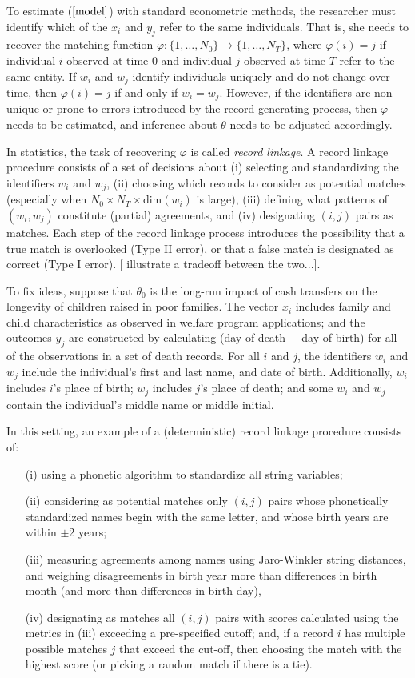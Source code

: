 \documentclass[12pt]{article}
\begin{document}
To estimate ($\ref{model}$) with standard econometric methods, the researcher must identify which of the $x_i$ and $y_j$ refer to the same individuals.   That is, she needs to recover the matching function $\varphi: \{1,\dots, N_0\} \to \{1,\dots, N_T\}$, where $\varphi(i) = j$ if individual $i$ observed at time 0 and individual $j$ observed at time $T$ refer to the same entity.  If $w_i$ and $w_j$ identify individuals uniquely and do not change over time, then $\varphi(i) = j$ if and only if $w_i = w_j$.  However, if the identifiers are non-unique or prone to errors introduced by the record-generating process, then $\varphi$ needs to be estimated, and inference about $\theta$ needs to be adjusted accordingly.   

In statistics, the task of recovering $\varphi$ is called \textit{record linkage}.  A record linkage procedure consists of a set of decisions about (i) selecting and standardizing the identifiers $w_i$ and $w_j$, (ii) choosing which records to consider as potential matches (especially when $N_0 \times N_T \times \text{dim}(w_i) $ is large), (iii) defining what patterns of $(w_i,w_j)$ constitute (partial) agreements, and (iv) designating $(i,j)$ pairs as matches.  Each step of the record linkage process introduces the possibility that a true match is overlooked (Type II error), or that a false match is designated as correct (Type I error).  [ \cite{abe2019} illustrate a tradeoff between the two...].  

To fix ideas, suppose that $\theta_0$ is the long-run impact of cash transfers on the longevity of children raised in poor families.  The vector $x_i$ includes family and child characteristics as observed in welfare program applications; and the outcomes $y_j$ are constructed by calculating (day of death $-$ day of birth) for all of the observations in a set of death records.  For all $i$ and $j$, the identifiers $w_i$ and $w_j$ include the individual's first and last name, and date of birth.  Additionally, $w_i$ includes $i$'s place of birth; $w_j$ includes $j$'s place of death; and some $w_i$ and $w_j$ contain the individual's middle name or middle initial. 

In this setting, an example of a (deterministic) record linkage procedure consists of: 
\begin{enumerate}
\item[(i)] using a phonetic algorithm to standardize all string variables; 
\item[(ii)] considering as potential matches only $(i,j)$ pairs whose phonetically standardized names begin with the same letter, and whose birth years are within $\pm$2 years;
\item[(iii)] measuring agreements among names using Jaro-Winkler string distances, and weighing disagreements in birth year more than differences in birth month (and more than differences in birth day), 
\item[(iv)] designating as matches all $(i,j)$ pairs with scores calculated using the metrics in (iii) exceeding a pre-specified cutoff; and, if a record $i$ has multiple possible matches $j$ that exceed the cut-off, then choosing the match with the highest score (or picking a random match if there is a tie).  
\end{enumerate}
\end{document}
